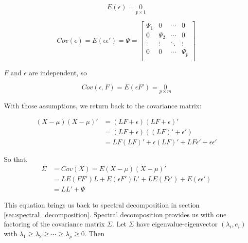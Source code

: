 \documentclass[a4paper]{book}
\begin{document}
  \begin{displaymath}
    E(\epsilon) = \underset{p \times 1}{0}
  \end{displaymath}

  \begin{displaymath}
    Cov(\epsilon) = E(\epsilon \epsilon') = \Psi = 
    \begin{bmatrix}
      \Psi_{1}  & 0             & \cdots & 0 \\
      0             & \Psi_{2}  & \cdots & 0 \\
      \vdots        & \vdots        & \ddots & \vdots \\
      0             & 0             & \cdots & \Psi_{p} \\
    \end{bmatrix}
  \end{displaymath}

  $F$ and $\epsilon$ are independent, so

  \begin{displaymath}
    Cov(\epsilon, F) = E(\epsilon F') = \underset{p \times m}{0}
  \end{displaymath}

  With those assumptions, we return back to the covariance matrix:

  \begin{align*}
    (X - \mu)(X - \mu)' &= (LF + \epsilon)(LF + \epsilon)'                  \\
                        &= (LF + \epsilon)((LF)' + \epsilon')               \\
                        &= LF(LF)' + \epsilon(LF)' + LF\epsilon' + \epsilon
                        \epsilon'                                           
  \end{align*}

  So that,
  \begin{align*}
    \Sigma  &= Cov(X) = E(X - \mu)(X - \mu)'                              \\
            &= LE(FF')L + E(\epsilon F')L' + LE(F\epsilon') + E(\epsilon
            \epsilon')                                                    \\
            &= LL' + \Psi
  \end{align*}

  This equation brings us back to spectral decomposition in section
  \ref{sec:spectral_decomposition}. Spectral decomposition provides us with one
  factoring of the covariance matrix $\Sigma$. Let $\Sigma$ have
  eigenvalue-eigenvector $(\lambda_{i}, e_{i})$ with $\lambda_{1} \geq
  \lambda_{2} \geq \cdots \geq \lambda_{p} \geq 0$. Then
\end{document}

